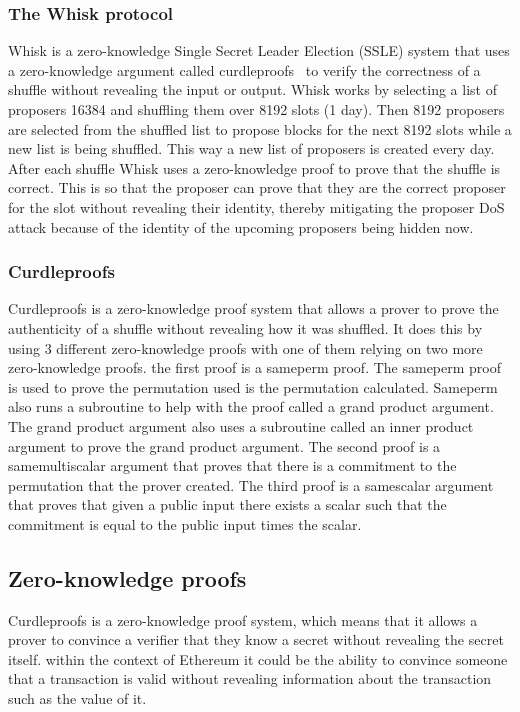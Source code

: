 \subsubsection{The Whisk protocol}\label{sec:background-mitigation}
Whisk is a zero-knowledge Single Secret Leader Election (SSLE) system that uses a zero-knowledge argument called curdleproofs~\cite{Curdleproofs} to verify the correctness of a shuffle without revealing the input or output.
Whisk works by selecting a list of proposers 16384 and shuffling them over 8192 slots (1 day).
Then 8192 proposers are selected from the shuffled list to propose blocks for the next 8192 slots while a new list is being shuffled.
This way a new list of proposers is created every day.
After each shuffle Whisk uses a zero-knowledge proof to prove that the shuffle is correct.
This is so that the proposer can prove that they are the correct proposer for the slot without revealing their identity, thereby mitigating the proposer DoS attack because of the identity of the upcoming proposers being hidden now.

\subsubsection{Curdleproofs}\label{sec:background-curdleproofs}
Curdleproofs is a zero-knowledge proof system that allows a prover to prove the authenticity of a shuffle without revealing how it was shuffled.
It does this by using 3 different zero-knowledge proofs with one of them relying on two more zero-knowledge proofs.
the first proof is a sameperm proof.
The sameperm proof is used to prove the permutation used is the permutation calculated.
Sameperm also runs a subroutine to help with the proof called a grand product argument.
The grand product argument also uses a subroutine called an inner product argument to prove the grand product argument.
The second proof is a samemultiscalar argument that proves that there is a commitment to the permutation that the prover created.
The third proof is a samescalar argument that proves that given a public input there exists a scalar such that the commitment is equal to the public input times the scalar.



\subsection{Zero-knowledge proofs}\label{sec:background-zkps}
Curdleproofs is a zero-knowledge proof system, which means that it allows a prover to convince a verifier that they know a secret without revealing the secret itself.
within the context of Ethereum it could be the ability to convince someone that a transaction is valid without revealing information about the transaction such as the value of it.



